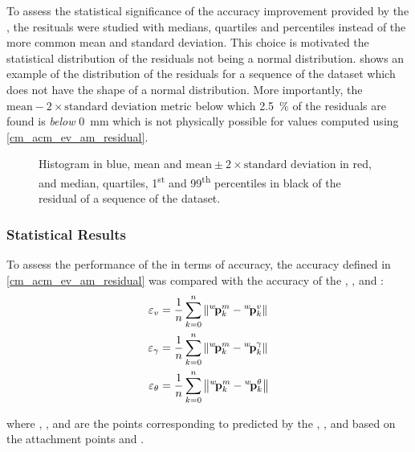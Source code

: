 To assess the statistical significance of the accuracy improvement provided by the
\augmentedmodel{}, the resituals were studied with medians, quartiles and percentiles instead of
the more common mean and standard deviation. This choice is motivated the statistical distribution
of the residuals not being a normal distribution.  shows an example
of the distribution of the residuals for a sequence of the dataset which does not have the shape of
a normal distribution. More importantly, the $\text{mean} - 2\times \text{standard deviation}$
metric below which \qty{2.5}{\percent} of the residuals are found is \emph{below} \qty{0}{\mm}
which is not physically possible for values computed using \cref{cm_acm_ev_am_residual}.

\begin{figure}
	\centering
	\caption{
		Histogram in blue, mean and $\text{mean}\pm 2\times\text{standard deviation}$ in red, and median, quartiles,
		1\textsuperscript{st} and 99\textsuperscript{th} percentiles in black of the residual of a sequence
		of the dataset.
	}
	\label{cm_acm_ev_sm_distribution}
\end{figure}

\subsubsection{Statistical Results}
\label{cm_acm_ev_statistical_results}

To assess the performance of the \thetagammamodel{} in terms of accuracy, the accuracy defined in
\cref{cm_acm_ev_am_residual} was compared with the accuracy of the \verticalmodel{}, \gammamodel{},
and \thetamodel{}:
\begin{align}
	\res{v}      & = \frac{1}{n} \sum_{k=0}^{n} \norm{\fllpoint{p}{w}{m}{k} - \fllpoint{p}{w}{v}{k}}      \\
	\res{\gamma} & = \frac{1}{n} \sum_{k=0}^{n} \norm{\fllpoint{p}{w}{m}{k} - \fllpoint{p}{w}{\gamma}{k}} \\
	\res{\theta} & = \frac{1}{n} \sum_{k=0}^{n} \norm{\fllpoint{p}{w}{m}{k} - \fllpoint{p}{w}{\theta}{k}}
\end{align}

where , , and  are the
points corresponding to  predicted by the \verticalmodel{}, \gammamodel{}, and
\thetamodel{} based on the attachment points  and .

